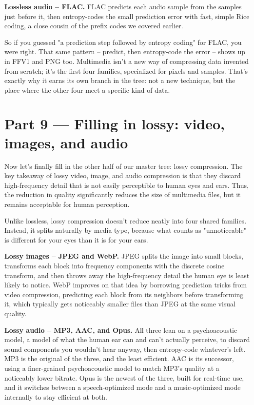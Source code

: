 \documentclass[11pt]{article}
\begin{document}
\textbf{Lossless audio -- FLAC.} FLAC predicts each audio sample from the samples just before it, then entropy-codes the small prediction error with fast, simple Rice coding, a close cousin of the prefix codes we covered earlier.

So if you guessed "a prediction step followed by entropy coding" for FLAC, you were right. That same pattern -- predict, then entropy-code the error -- shows up in FFV1 and PNG too. Multimedia isn't a new way of compressing data invented from scratch; it's the first four families, specialized for pixels and samples. That's exactly why it earns its own branch in the tree: not a new technique, but the place where the other four meet a specific kind of data.

\section*{Part 9 --- Filling in lossy: video, images, and audio}

Now let's finally fill in the other half of our master tree: lossy compression. The key takeaway of lossy video, image, and audio compression is that they discard high-frequency detail that is not easily perceptible to human eyes and ears. Thus, the reduction in quality significantly reduces the size of multimedia files, but it remains acceptable for human perception.

Unlike lossless, lossy compression doesn't reduce neatly into four shared families. Instead, it splits naturally by media type, because what counts as "unnoticeable" is different for your eyes than it is for your ears.

\textbf{Lossy images -- JPEG and WebP.} JPEG splits the image into small blocks, transforms each block into frequency components with the discrete cosine transform, and then throws away the high-frequency detail the human eye is least likely to notice. WebP improves on that idea by borrowing prediction tricks from video compression, predicting each block from its neighbors before transforming it, which typically gets noticeably smaller files than JPEG at the same visual quality.

\textbf{Lossy audio -- MP3, AAC, and Opus.} All three lean on a psychoacoustic model, a model of what the human ear can and can't actually perceive, to discard sound components you wouldn't hear anyway, then entropy-code whatever's left. MP3 is the original of the three, and the least efficient. AAC is its successor, using a finer-grained psychoacoustic model to match MP3's quality at a noticeably lower bitrate. Opus is the newest of the three, built for real-time use, and it switches between a speech-optimized mode and a music-optimized mode internally to stay efficient at both.
\end{document}
